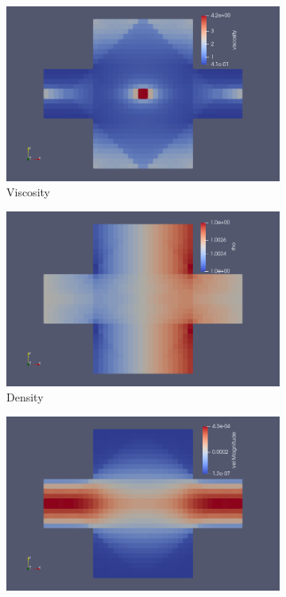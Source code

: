 \documentclass[11pt,a4paper]{report}
\begin{document}
\begin{figure}[!h]
	\begin{subfigure}{0.30\textwidth}
		\includegraphics[width=1.2\textwidth]{./Figures/polymer_run_viscosity.png}
		\caption{Viscosity}
	\end{subfigure}
	\begin{subfigure}{0.30\textwidth}
		\includegraphics[width=1.2\textwidth]{./Figures/polymer_run_rho.png}
		\caption{Density}
	\end{subfigure}
	\begin{subfigure}{0.30\textwidth}
		\includegraphics[width=1.2\textwidth]{./Figures/polymer_run_vel.png}

\end{subfigure}
\end{figure}
\end{document}
